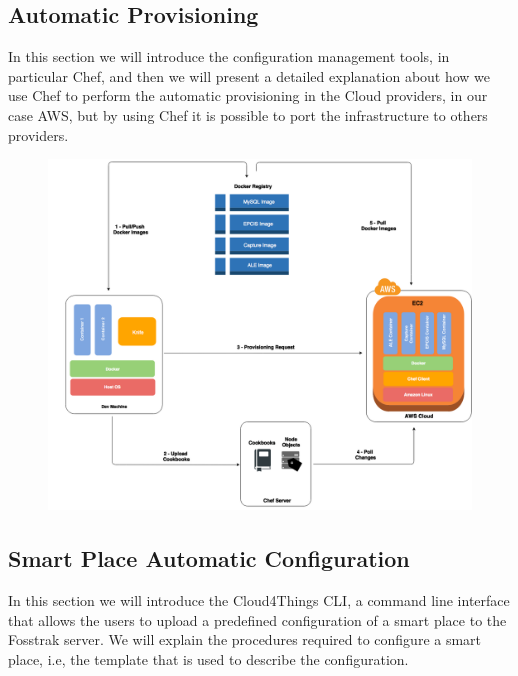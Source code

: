 \subsection{Automatic Provisioning}
\label{sub:Automatic Provisioning}
In this section we will introduce the configuration management tools, in particular Chef, and then
we will present a detailed explanation about how we use Chef to perform the automatic provisioning
in the Cloud providers, in our case AWS, but by using Chef it is possible to port the
infrastructure to others providers.
\begin{figure}
  \centering
  \includegraphics[width=.8\textwidth]{images/docker-c4t}
\end{figure}
\subsection{Smart Place Automatic Configuration}
\label{sub:Smart Place Automatic Configuration}
In this section we will introduce the Cloud4Things CLI, a command line interface that allows the
users to upload a predefined configuration of a smart place to the Fosstrak server. We will explain
the procedures required to configure a smart place, i.e, the template that is used to describe the
configuration.
